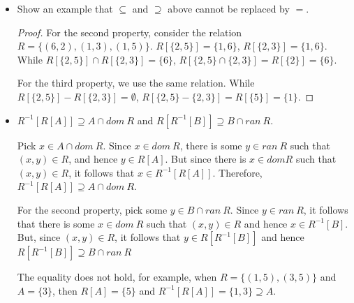 \begin{itemize}
    \item Show an example that $\subseteq$ and $\supseteq$ above cannot be replaced by $=$.
    
    \begin{proof}
    For the second property, consider the relation $R = \{(6, 2), (1,3), (1, 5)\}$. $R[\{2, 5\}] = \{1, 6\}$, $R[\{2, 3\}] = \{1, 6\}$. While $R[\{2, 5\}] \cap R[\{2, 3\}] = \{6\}$, $R[\{2,5\} \cap \{2,3\}] = R[\{2\}] = \{6\}$.
    
    For the third property, we use the same relation. While $R[\{2, 5\}] - R[\{2, 3\}] = \emptyset$, $R[\{2,5\} - \{2,3\}] = R[\{5\}] = \{1\}$.
    \end{proof}
    
    \item $R^{-1}[R[A]] \supseteq A \cap dom~R$ and $R[R^{-1}[B]] \supseteq B \cap ran~R$.
    
    Pick $x \in A \cap dom~R$. Since $x \in dom~R$, there is some $y \in ran~R$ such that $(x,y) \in R$, and hence $y \in R[A]$. But since there is $x \in dom R$ such that $(x,y) \in R$, it follows that $x \in R^{-1}[R[A]]$. Therefore, $R^{-1}[R[A]] \supseteq A \cap dom~R$.
    
    \vspace{1em}
    
    For the second property, pick some $y \in B \cap ran~R$. Since $y \in ran~R$, it follows that there is some $x \in dom~R$ such that $(x,y) \in R$ and hence $x \in R^{-1}[B]$. But, since $(x,y) \in R$, it follows that $y \in R[R^{-1}[B]]$ and hence $R[R^{-1}[B]] \supseteq B \cap ran~R$
    
    \vspace{1em}
    
    The equality does not hold, for example, when $R = \{(1,5), (3, 5)\}$ and $A = \{3\}$, then $R[A] = \{5\}$ and $R^{-1}[R[A]] = \{1,3\} \supseteq A$. 
\end{itemize}


